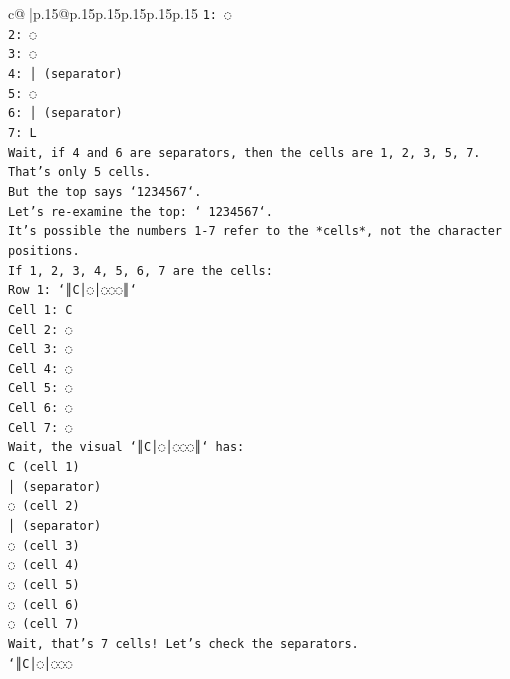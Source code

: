 \documentclass{article}
\begin{document}
{\begin{supertabular}{c@{$\;$}|p{.15\linewidth}@{}p{.15\linewidth}p{.15\linewidth}p{.15\linewidth}p{.15\linewidth}p{.15\linewidth}}
{{{\texttt{1: ◌} \\
\texttt{2: ◌} \\
\texttt{3: ◌} \\
\texttt{4: │ (separator)} \\
\texttt{5: ◌} \\
\texttt{6: │ (separator)} \\
\texttt{7: L} \\
\texttt{Wait, if 4 and 6 are separators, then the cells are 1, 2, 3, 5, 7. That's only 5 cells.} \\
\texttt{But the top says `1234567`.} \\
\texttt{Let's re{-}examine the top: ` 1234567`.} \\
\texttt{It's possible the numbers 1{-}7 refer to the *cells*, not the character positions.} \\
\texttt{If 1, 2, 3, 4, 5, 6, 7 are the cells:} \\
\texttt{Row 1: `║C│◌│◌◌◌║`} \\
\texttt{Cell 1: C} \\
\texttt{Cell 2: ◌} \\
\texttt{Cell 3: ◌} \\
\texttt{Cell 4: ◌} \\
\texttt{Cell 5: ◌} \\
\texttt{Cell 6: ◌} \\
\texttt{Cell 7: ◌} \\
\texttt{Wait, the visual `║C│◌│◌◌◌║` has:} \\
\texttt{C (cell 1)} \\
\texttt{│ (separator)} \\
\texttt{◌ (cell 2)} \\
\texttt{│ (separator)} \\
\texttt{◌ (cell 3)} \\
\texttt{◌ (cell 4)} \\
\texttt{◌ (cell 5)} \\
\texttt{◌ (cell 6)} \\
\texttt{◌ (cell 7)} \\
\texttt{Wait, that's 7 cells! Let's check the separators.} \\
\texttt{`║C│◌│◌◌◌} \\
            }
        }
    }
     \\ \\


\end{supertabular}}
\end{document}
